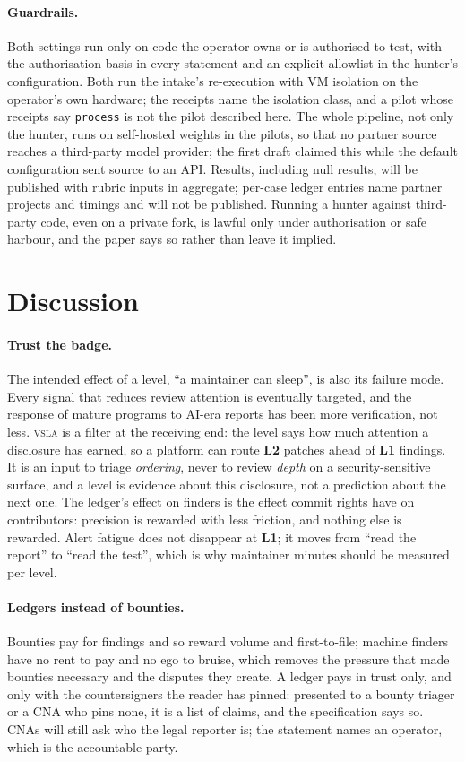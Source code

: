 \documentclass[11pt]{article}
\newcommand{\vsla}{\textsc{vsla}}
\newcommand{\lvl}[1]{\textbf{L#1}}
\begin{document}
\paragraph{Guardrails.} Both settings run only on code the operator owns or is authorised to test, with the
authorisation basis in every statement and an explicit allowlist in the hunter's configuration. Both run the
intake's re-execution with VM isolation on the operator's own hardware; the receipts name the isolation class, and
a pilot whose receipts say \texttt{process} is not the pilot described here. The whole
pipeline, not only the hunter, runs on self-hosted weights in the pilots, so that no partner source reaches a
third-party model provider; the first draft claimed this while the default configuration sent source to an
API. Results, including null results, will be published with rubric inputs in aggregate; per-case ledger
entries name partner projects and timings and will not be published. Running a hunter against third-party
code, even on a private fork, is lawful only under authorisation or safe harbour, and the paper says so
rather than leave it implied.

\section{Discussion}
\label{sec:discussion}

\paragraph{Trust the badge.} The intended effect of a level, ``a maintainer can sleep'', is also its failure
mode. Every signal that reduces review attention is eventually targeted, and the response of mature programs
to AI-era reports has been more verification, not less. \vsla{} is a filter at the receiving end: the level says
how much attention a disclosure has earned, so a platform can route \lvl{2} patches ahead of \lvl{1} findings.
It is an input to triage \emph{ordering}, never to review \emph{depth} on a security-sensitive surface, and a
level is evidence about this disclosure, not a prediction about the next one. The ledger's effect on finders is
the effect commit rights have on contributors: precision is rewarded with less friction, and nothing else is
rewarded. Alert fatigue does not disappear at \lvl{1}; it moves from ``read the report'' to ``read the test'',
which is why maintainer minutes should be measured per level.

\paragraph{Ledgers instead of bounties.} Bounties pay for findings and so reward volume and first-to-file;
machine finders have no rent to pay and no ego to bruise, which removes the pressure that made bounties
necessary and the disputes they create. A ledger pays in trust only, and only with the countersigners the
reader has pinned: presented to a bounty triager or a CNA who pins none, it is a list of claims, and the
specification says so. CNAs will still ask who the legal reporter is; the statement names an operator, which is
the accountable party.
\end{document}
